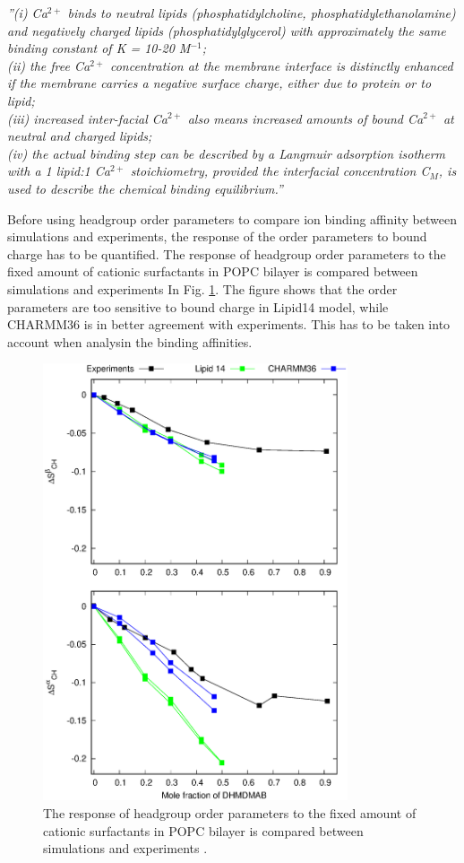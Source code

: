 \documentclass[aps,prl,superscriptaddress,twocolumn]{revtex4}
\begin{document}
\begin{displayquote}
  {\it ''(i) Ca$^{2+}$ binds to neutral lipids (phosphatidylcholine, phosphatidylethanolamine) and negatively charged lipids
    (phosphatidylglycerol) with approximately the same binding constant of K = 10-20 M$^{-1}$; \\
    (ii) the free Ca$^{2+}$
    concentration at the membrane interface is distinctly enhanced if the membrane carries a negative surface
    charge, either due to protein or to lipid; \\
    (iii) increased inter-facial Ca$^{2+}$ also means increased amounts
    of bound Ca$^{2+}$ at neutral and charged lipids; \\
    (iv) the actual binding step can be described by a Langmuir
    adsorption isotherm with a 1 lipid:1 Ca$^{2+}$ stoichiometry, provided the interfacial concentration C$_M$, is
    used to describe the chemical binding equilibrium.''}
\end{displayquote}

Before using headgroup order parameters to compare ion binding affinity between simulations
and experiments, the response of the order parameters to bound charge has to be quantified.
The response of headgroup order parameters to the fixed amount of cationic surfactants in
POPC bilayer is compared between simulations and experiments \cite{scherer89} In Fig. \ref{CHANGESwithCaClPGPS}.
The figure shows that the order parameters are too sensitive to bound charge in Lipid14 model,
while CHARMM36 is in better agreement with experiments. This has to be taken into account when
analysin the binding affinities.
\begin{figure}[]
  \centering
  \includegraphics[width=9.0cm]{../Figs/HGopsDHMDMAB.eps}
  \caption{\label{CHANGESwithCaClPGPS}
  The response of headgroup order parameters to the fixed amount of cationic surfactants in
  POPC bilayer is compared between simulations and experiments \cite{scherer89}.}
\end{figure}
\end{document}
